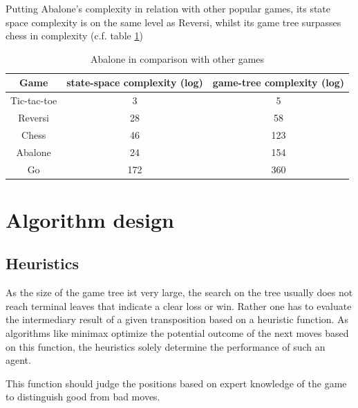 \documentclass{llncs}
\begin{document}
Putting Abalone's complexity in relation with other popular games, its state space complexity is on the same level as Reversi, whilst its game tree surpasses chess in complexity (c.f. table \ref{complexity_table})

\begin{table}
  \begin{center}
    \begin{tabular}{ | c | c | c | }
      \hline
      Game        & state-space complexity (log) & game-tree complexity (log) \\
      \hline
      Tic-tac-toe & 3                            & 5                          \\
      \hline
      Reversi     & 28                           & 58                         \\
      \hline
      Chess       & 46                           & 123                        \\
      \hline
      Abalone     & 24                           & 154                        \\
      \hline
      Go          & 172                          & 360                        \\
      \hline
    \end{tabular}
  \end{center}
  \caption{Abalone in comparison with other games \cite{chorus_implementing_2009}}
  \label{complexity_table}
\end{table}


\section{Algorithm design}


\subsection{Heuristics}
As the size of the game tree ist very large, the search on the tree usually does not reach terminal leaves that indicate a clear loss or win. Rather one has to evaluate the intermediary result of a given transposition based on a heuristic function. As algorithms like minimax optimize the potential outcome of the next moves based on this function, the heuristics solely determine the performance of such an agent.

This function should judge the positions based on expert knowledge of the game to distinguish good from bad moves.
\end{document}
